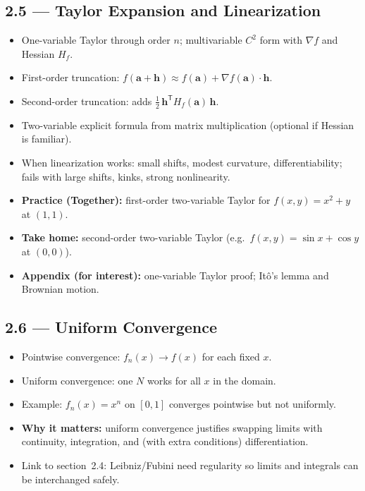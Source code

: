 \documentclass[11pt,a4paper]{article}
\begin{document}
\subsection{2.5 --- Taylor Expansion and Linearization}
\begin{itemize}[leftmargin=*]
    \item One-variable Taylor through order $n$; multivariable $C^2$ form with $\nabla f$ and Hessian $H_f$.
    \item First-order truncation: $f(\mathbf{a}+\mathbf{h})\approx f(\mathbf{a})+\nabla f(\mathbf{a})\cdot\mathbf{h}$.
    \item Second-order truncation: adds $\tfrac12\,\mathbf{h}^{\mathsf T}H_f(\mathbf{a})\,\mathbf{h}$.
    \item Two-variable explicit formula from matrix multiplication (optional if Hessian is familiar).
    \item When linearization works: small shifts, modest curvature, differentiability;
      fails with large shifts, kinks, strong nonlinearity.
    \item \textbf{Practice (Together):} first-order two-variable Taylor for $f(x,y)=x^2+y$ at $(1,1)$.
    \item \textbf{Take home:} second-order two-variable Taylor (e.g.\ $f(x,y)=\sin x+\cos y$ at $(0,0)$).
    \item \textbf{Appendix (for interest):} one-variable Taylor proof; It\^o's lemma and Brownian motion.
\end{itemize}

\subsection{2.6 --- Uniform Convergence}
\begin{itemize}[leftmargin=*]
    \item Pointwise convergence: $f_n(x)\to f(x)$ for each fixed $x$.
    \item Uniform convergence: one $N$ works for all $x$ in the domain.
    \item Example: $f_n(x)=x^n$ on $[0,1]$ converges pointwise but not uniformly.
    \item \textbf{Why it matters:} uniform convergence justifies swapping limits with continuity,
      integration, and (with extra conditions) differentiation.
    \item Link to section~2.4: Leibniz/Fubini need regularity so limits and integrals can be interchanged safely.
\end{itemize}
\end{document}
